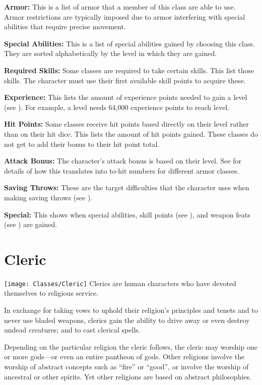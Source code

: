 \begin{multicols*}{2}
\textbf{Armor:} This is a list of armor that a member of this class are able to use. Armor restrictions are typically imposed due to armor interfering with special abilities that require precise movement.

\textbf{Special Abilities:} This is a list of special abilities gained by choosing this class. They are sorted alphabetically by the level in which they are gained.

\textbf{Required Skills:} Some classes are required to take certain skills. This list those skills. The character must use their first available skill points to acquire these.

\textbf{Experience:} This lists the amount of experience points needed to gain a level (see ). For example, a  level  needs 64,000 experience points to reach  level.

\textbf{Hit Points:} Some classes receive hit points based directly on their level rather than on their hit dice. This lists the amount of hit points gained. These classes do not get to add their  bonus to their hit point total.

\textbf{Attack Bonus:} The character’s attack bonus is based on their level. See  for details of how this translates into to-hit numbers for different armor classes.

\textbf{Saving Throws:} These are the target difficulties that the character uses when making saving throws (see ).

\textbf{Special:} This shows when special abilities, skill points (see ), and weapon feats (see ) are gained.

\section{Cleric}\label{class:Cleric}
\texttt{[image: Classes/Cleric]}
Clerics are human characters who have devoted themselves to religious service.

In exchange for taking vows to uphold their religion’s principles and tenets and to never use bladed weapons, clerics gain the ability to drive away or even destroy undead creatures; and to cast clerical spells.

Depending on the particular religion the cleric follows, the cleric may worship one or more gods—or even an entire pantheon of gods. Other religions involve the worship of abstract concepts such as “fire” or “good”, or involve the worship of ancestral or other spirits. Yet other religions are based on abstract philosophies.


\end{multicols*}
